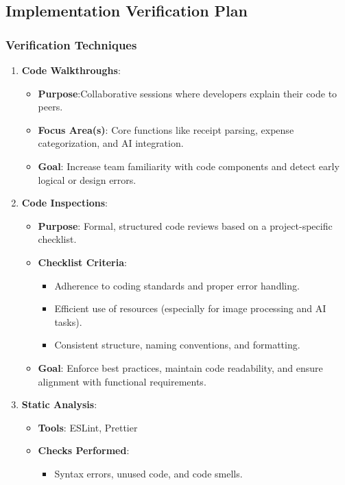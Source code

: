 \documentclass[12pt, titlepage]{article}
\begin{document}
\newpage

\subsection{Implementation Verification Plan}

\subsubsection{Verification Techniques}

\begin{enumerate}
	\item \textbf{Code Walkthroughs}:
	\begin{itemize}
		\item \textbf{Purpose}:Collaborative sessions where developers explain their code to peers.
		\item \textbf{Focus Area(s)}: Core functions like receipt parsing, expense categorization, and AI integration.
		\item \textbf{Goal}: Increase team familiarity with code components and detect early logical or design errors.
	\end{itemize}
	\item \textbf{Code Inspections}:
	\begin{itemize}
		\item \textbf{Purpose}: Formal, structured code reviews based on a project-specific checklist.
		\item \textbf{Checklist Criteria}:
		\begin{itemize}
			\item Adherence to coding standards and proper error handling.
			\item Efficient use of resources (especially for image processing and AI tasks).
			\item Consistent structure, naming conventions, and formatting.
		\end{itemize}
		\item \textbf{Goal}: Enforce best practices, maintain code readability, and ensure alignment with functional requirements.
	\end{itemize}
	\item \textbf{Static Analysis}:
	\begin{itemize}
		\item \textbf{Tools}: ESLint, Prettier
		\item \textbf{Checks Performed}:
		\begin{itemize}
			\item Syntax errors, unused code, and code smells.

\end{itemize}
\end{itemize}
\end{enumerate}
\end{document}

